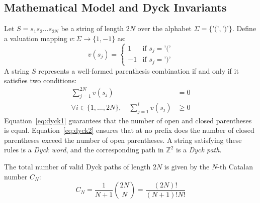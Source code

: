\documentclass[10pt,journal,compsoc,onecolumn]{IEEEtran}
\begin{document}
\subsection{Mathematical Model and Dyck Invariants}
Let $S = s_1 s_2 \ldots s_{2N}$ be a string of length $2N$ over the alphabet $\Sigma = \{\text{'('}, \text{')'}\}$. Define a valuation mapping $v: \Sigma \to \{1, -1\}$ as:
\begin{equation}
v(s_j) = \begin{cases} 
1 & \text{if } s_j = \text{'('} \\
-1 & \text{if } s_j = \text{')'} 
\end{cases}
\end{equation}
A string $S$ represents a well-formed parenthesis combination if and only if it satisfies two conditions:
\begin{align}
\sum_{j=1}^{2N} v(s_j) &= 0 \label{eq:dyck1} \\
\forall i \in \{1, \ldots, 2N\}, \quad \sum_{j=1}^{i} v(s_j) &\ge 0 \label{eq:dyck2}
\end{align}
Equation~\eqref{eq:dyck1} guarantees that the number of open and closed parentheses is equal. Equation~\eqref{eq:dyck2} ensures that at no prefix does the number of closed parentheses exceed the number of open parentheses. A string satisfying these rules is a \emph{Dyck word}, and the corresponding path in $\mathbb{Z}^2$ is a \emph{Dyck path}.

The total number of valid Dyck paths of length $2N$ is given by the $N$-th Catalan number $C_N$:
\begin{equation}
C_N = \frac{1}{N+1}\binom{2N}{N} = \frac{(2N)!}{(N+1)!N!}
\end{equation}
\end{document}
